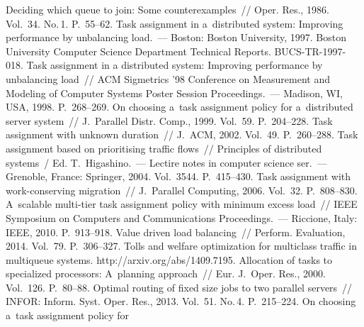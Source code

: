 \begin{multicols}{2}
{{\begin{thebibliography}{99}
     Deciding which queue to join: Some counterexamples~// Oper. Res., 
1986. Vol.~34. No.\,1. P.~55--62.
     Task assignment in a~distributed system: 
Improving performance by unbalancing load.~--- Boston: Boston University, 1997.
Boston University Computer Science 
Department Technical Reports. BUCS-TR-1997-018.
     Task assignment in a distributed system: 
Improving performance by unbalancing load~// ACM Sigmetrics '98 Conference on 
Measurement and Modeling of Computer Systems Poster Session Proceedings.~--- Madison, WI, USA, 
1998. P.~268--269.
     On choosing a~task assignment policy for 
a~distributed server system~// J.~Parallel Distr. Comp., 1999. Vol.~59. P.~204--228.
     Task assignment with unknown duration~// J.~ACM, 2002. 
Vol.~49. P.~260--288.
     Task assignment based on prioritising traffic 
flows~// Principles of distributed systems~/
Ed. T.~Higashino.~--- Lectire notes in
computer science ser.~--- Grenoble, France:  Springer, 2004. Vol.~3544. P.~415--430.
     Task assignment with work-conserving 
migration~// J.~Parallel Computing, 2006. Vol.~32. P.~808--830.
     A~scalable multi-tier task assignment 
policy with minimum excess load~//  IEEE Symposium on Computers and Communications 
Proceedings.~--- Riccione, Italy: IEEE, 2010. P.~913--918.
     Value driven load 
balancing~// Perform. Evaluation, 2014. Vol.~79. P.~306--327.
     Tolls and welfare optimization for multiclass 
traffic in multiqueue systems. {\sf http://arxiv.org/abs/1409.7195}.
     Allocation of 
tasks to specialized processors: A~planning approach~// Eur. J.~Oper. Res., 
2000. Vol.~126. P.~80--88.
     Optimal routing of fixed size jobs to two parallel servers~// 
INFOR: Inform. Syst. Oper. Res., 2013. Vol.~51. No.\,4. P.~215--224.
     On choosing a~task assignment policy for 

\end{thebibliography}}}
\end{multicols}
